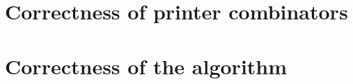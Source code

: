 \documentclass[14pt]{constructor-diploma}
\begin{document}



  

\section{Correctness of printer combinators}

\section{Correctness of the algorithm}

\end{document}

